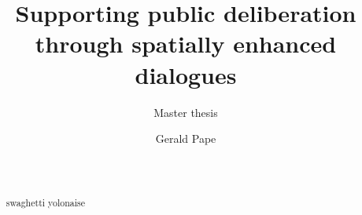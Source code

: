 \documentclass{sigchi}
\begin{document}
\title{Supporting public deliberation\\through spatially enhanced dialogues}
\subtitle{Master thesis}

\author{
  \alignauthor Gerald Pape\\
    \\
    \\
}

\maketitle

\begin{abstract}
swaghetti yolonaise
\end{abstract}



\end{document}
